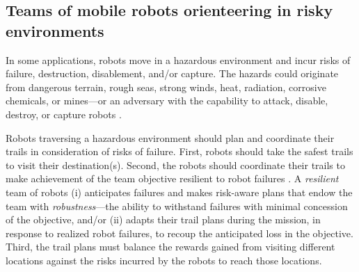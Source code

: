 \documentclass[11pt, oneside]{article}
\begin{document}
\subsection{Teams of mobile robots orienteering in risky environments} 
In some applications, robots move in a hazardous environment \cite{trevelyan2016robotics} and incur risks of failure, destruction, disablement, and/or capture. 
The hazards could originate from dangerous terrain, rough seas, strong winds, heat, radiation, corrosive chemicals, or mines---or an adversary with the capability to attack, disable, destroy, or capture robots \cite{agmon2017robotic}. 

Robots traversing a hazardous environment should plan and coordinate their trails in consideration of risks of failure.
First, robots should take the safest trails to visit their destination(s). 
Second, the robots should coordinate their trails to make achievement of the team objective resilient to robot failures \cite{zhou2021multi}. 
A \emph{resilient} team of robots \cite{prorok2021beyond}
(i) anticipates failures and makes risk-aware plans that endow the team with \emph{robustness}---the ability to withstand failures with minimal concession of the objective,
and/or
(ii) adapts their trail plans during the mission, in response to realized robot failures, to recoup the anticipated loss in the objective. 
Third, the trail plans must balance the rewards gained from visiting different locations against the risks incurred by the robots to reach those locations.
\end{document}
